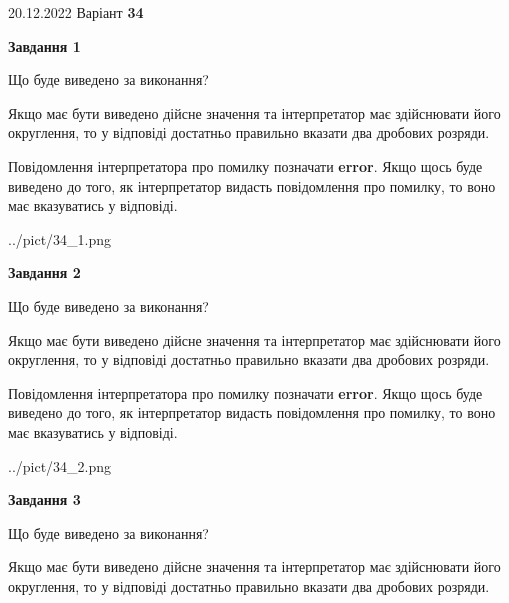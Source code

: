 \documentclass[12pt, ukrainian]{article}
\begin{document}
{20.12.2022 Варіант \No \textbf { 34 }\par}
{
\begin {Large}

{\begin {center}\textbf{Завдання 1}\end {center}}\par
Що буде виведено за виконання? \par

Якщо має бути виведено дійсне значення та інтерпретатор має здійснювати його округлення, 
то у відповіді достатньо правильно вказати два дробових розряди.

Повідомлення інтерпретатора про помилку позначати \textbf{error}.
Якщо щось буде виведено до того, як інтерпретатор видасть повідомлення про помилку, 
то воно має вказуватись у відповіді. \par

\begin{center}
	{../pict/34_1.png}
\end{center}
\newpage

{\begin {center}\textbf{Завдання 2}\end {center}}\par
Що буде виведено за виконання? \par

Якщо має бути виведено дійсне значення та інтерпретатор має здійснювати його округлення, 
то у відповіді достатньо правильно вказати два дробових розряди.

Повідомлення інтерпретатора про помилку позначати \textbf{error}.
Якщо щось буде виведено до того, як інтерпретатор видасть повідомлення про помилку, 
то воно має вказуватись у відповіді. \par

\begin{center}
	{../pict/34_2.png}
\end{center}
\newpage

{\begin {center}\textbf{Завдання 3}\end {center}}\par
Що буде виведено за виконання? \par

Якщо має бути виведено дійсне значення та інтерпретатор має здійснювати його округлення, 
то у відповіді достатньо правильно вказати два дробових розряди.


\end{Large}}
\end{document}

